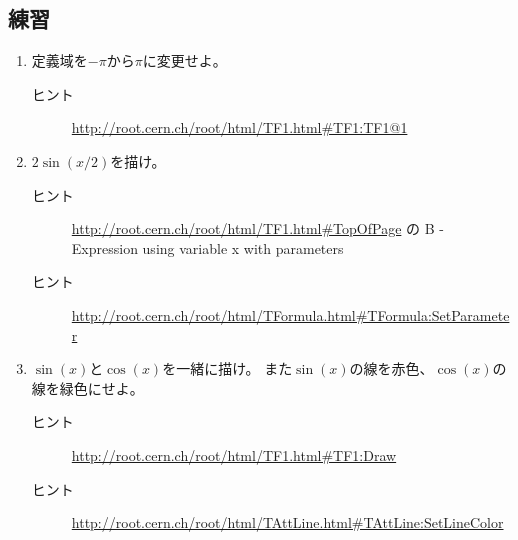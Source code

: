 \documentclass{jarticle}
\begin{document}
  \subsection{練習}
  \begin{enumerate}
   \item 定義域を$-\pi$から$\pi$に変更せよ。
	 \begin{description}
	  \item[ヒント]  \url{http://root.cern.ch/root/html/TF1.html#TF1:TF1@1}
	 \end{description}
   \item $2\sin(x/2)$を描け。
	 \begin{description}
	  \item[ヒント]  \url{http://root.cern.ch/root/html/TF1.html#TopOfPage} の
		     B - Expression using variable x with parameters
	  \item[ヒント]\url{http://root.cern.ch/root/html/TFormula.html#TFormula:SetParameter}
	 \end{description}
   \item $ \sin(x) $と$ \cos(x) $を一緒に描け。
	 また$\sin(x)$の線を赤色、$\cos(x)$の線を緑色にせよ。
	 \begin{description}
	  \item[ヒント]  \url{http://root.cern.ch/root/html/TF1.html#TF1:Draw}
	  \item[ヒント]  \url{http://root.cern.ch/root/html/TAttLine.html#TAttLine:SetLineColor}
	 \end{description}

  \end{enumerate}
\end{document}
